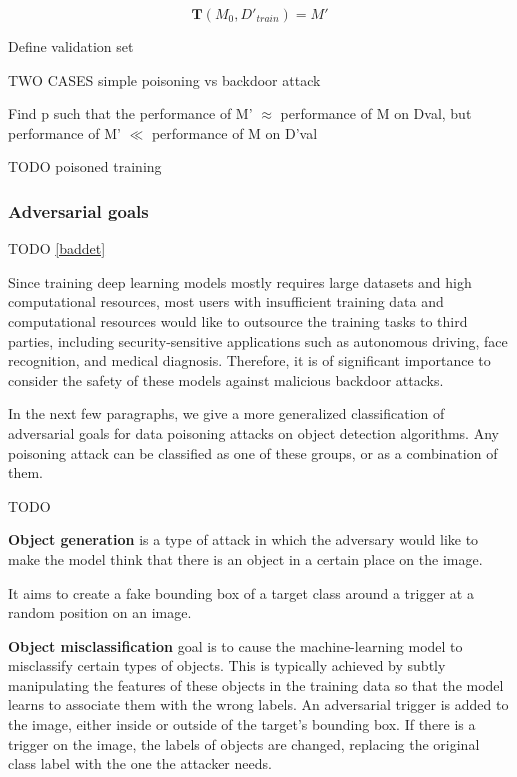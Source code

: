 \documentclass[14pt,a4paper]{extarticle}
\newcounter{e}
\newcounter{pic}
\numberwithin{equation}{section}
\numberwithin{figure}{section}
\begin{document}
\begin{equation}
    \label{poisoned-model}
    \mathbf{T}(M_{0}, D'_{train}) = M'
\end{equation}

Define validation set



TWO CASES simple poisoning vs backdoor attack

Find p such that the performance of M' $\approx$ performance of M on Dval, but performance of M' $\ll$ performance of M on D'val 

TODO poisoned training



\subsubsection{Adversarial goals}
TODO \ref{baddet}

Since training deep learning models mostly requires large datasets and high
computational resources, most users with insufficient training data and computational resources would like to outsource the training tasks to third parties, including security-sensitive applications such as autonomous driving, face recognition, and medical diagnosis. Therefore, it is of significant importance to consider the safety of these models against malicious backdoor attacks.

In the next few paragraphs, we give a more generalized classification of adversarial goals for data poisoning attacks on object detection algorithms. Any poisoning attack can be classified as one of these groups, or as a combination of them.

TODO

\textbf{Object generation} is a type of attack in which the adversary would like to make the model think that there is an object in a certain place on the image. 

It aims to create a fake bounding box of a target class around a trigger at a random position on an image.

\textbf{Object misclassification} goal is to cause the machine-learning model to misclassify certain types of objects. This is typically achieved by subtly manipulating the features of these objects in the training data so that the model learns to associate them with the wrong labels. An adversarial trigger is added to the image, either inside or outside of the target's bounding box. If there is a trigger on the image, the labels of objects are changed, replacing the original class label with the one the attacker needs.
\end{document}
